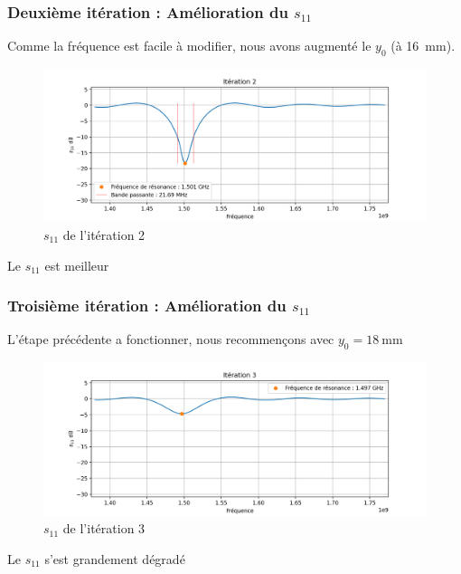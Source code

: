 \documentclass[Deriaz_Traiber_Labo02.tex]{subfiles}
\begin{document}
\subsubsection{Deuxième itération : Amélioration du $s_{11}$}
Comme la fréquence est facile à modifier, nous avons augmenté le $y_0$ (à \SI{16}{\milli\meter}).
\begin{figure}[H]
\centering
\includegraphics[width=15cm]{../Calculs/run_id_ceramique_2.png}
\caption[caption]{$s_{11}$ de l'itération 2}
\end{figure}
Le $s_{11}$ est meilleur
\subsubsection{Troisième itération : Amélioration du $s_{11}$}
L'étape précédente a fonctionner, nous recommençons avec $y_0=\SI{18}{\milli\meter}$
\begin{figure}[H]
\centering
\includegraphics[width=15cm]{../Calculs/run_id_ceramique_3.png}
\caption[caption]{$s_{11}$ de l'itération 3}
\end{figure}
Le $s_{11}$ s'est grandement dégradé
\end{document}
